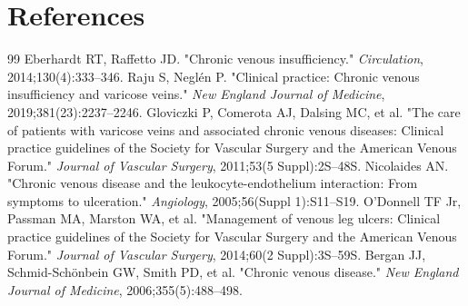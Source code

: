 \section*{References}
\begin{thebibliography}{99}
 Eberhardt RT, Raffetto JD. "Chronic venous insufficiency." \textit{Circulation}, 2014;130(4):333--346.
 Raju S, Negl\'{e}n P. "Clinical practice: Chronic venous insufficiency and varicose veins." \textit{New England Journal of Medicine}, 2019;381(23):2237--2246.
 Gloviczki P, Comerota AJ, Dalsing MC, et al. "The care of patients with varicose veins and associated chronic venous diseases: Clinical practice guidelines of the Society for Vascular Surgery and the American Venous Forum." \textit{Journal of Vascular Surgery}, 2011;53(5 Suppl):2S--48S.
 Nicolaides AN. "Chronic venous disease and the leukocyte-endothelium interaction: From symptoms to ulceration." \textit{Angiology}, 2005;56(Suppl 1):S11--S19.
 O'Donnell TF Jr, Passman MA, Marston WA, et al. "Management of venous leg ulcers: Clinical practice guidelines of the Society for Vascular Surgery and the American Venous Forum." \textit{Journal of Vascular Surgery}, 2014;60(2 Suppl):3S--59S.
 Bergan JJ, Schmid-Sch\"{o}nbein GW, Smith PD, et al. "Chronic venous disease." \textit{New England Journal of Medicine}, 2006;355(5):488--498.
\end{thebibliography}
